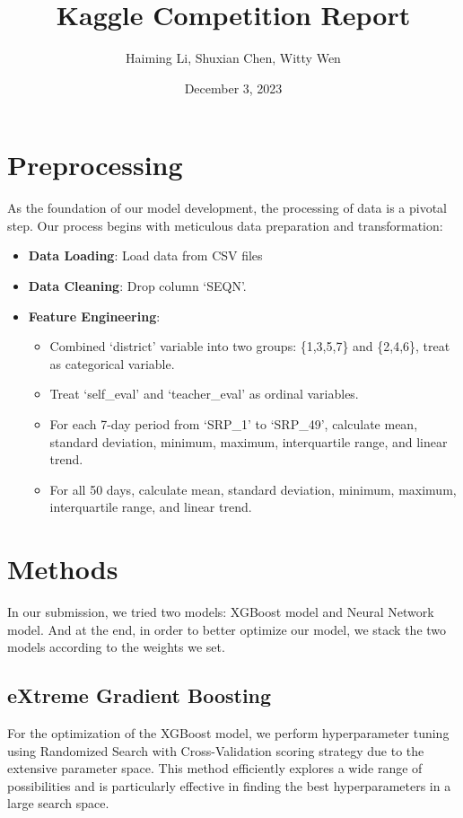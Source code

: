 \documentclass{article}
\title{\textbf{Kaggle Competition Report}}
\author{Haiming Li, Shuxian Chen, Witty Wen}
\date{December 3, 2023}
\begin{document}
\maketitle
\section{Preprocessing}

As the foundation of our model development, the processing of data is a pivotal step. Our process begins with meticulous data preparation and transformation:

\begin{itemize}
    \item \textbf{Data Loading}: Load data from CSV files
    \item \textbf{Data Cleaning}: Drop column `SEQN'.
    \item \textbf{Feature Engineering}:
        \begin{itemize}
            \item Combined `district' variable into two groups: \{1,3,5,7\} and \{2,4,6\}, treat as categorical variable.
            \item Treat `self\_eval' and `teacher\_eval' as ordinal variables.
            \item For each 7-day period from `SRP\_1' to `SRP\_49', calculate mean, standard deviation, minimum, maximum, interquartile range, and linear trend.
            \item For all 50 days, calculate mean, standard deviation, minimum, maximum, interquartile range, and linear trend.
        \end{itemize}
\end{itemize}


\section{Methods} 

In our submission, we tried two models: XGBoost model and Neural Network model. And at the end, in order to better optimize our model, we stack the two models according to the weights we set.
\subsection{eXtreme Gradient Boosting}

For the optimization of the XGBoost model, we perform hyperparameter tuning using Randomized Search with Cross-Validation scoring strategy due to the extensive parameter space. This method efficiently explores a wide range of possibilities and is particularly effective in finding the best hyperparameters in a large search space.
\end{document}
